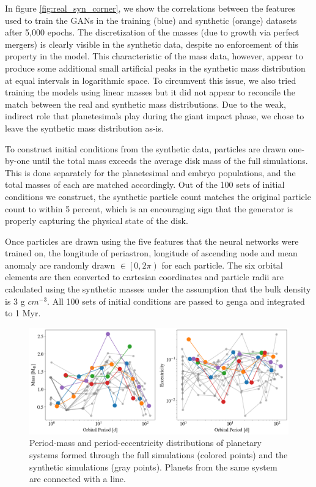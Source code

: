 In figure \ref{fig:real_syn_corner}, we show the correlations between the features used to train the GANs in the training (blue) and synthetic (orange) datasets after 5,000 epochs. The discretization of the masses (due to growth via perfect mergers) is clearly visible in the synthetic data, despite no enforcement of this property in the model. This characteristic of the mass data, however, appear to produce some additional small artificial peaks in the synthetic mass distribution at equal intervals in logarithmic space. To circumvent this issue, we also tried training the models using linear masses but it did not appear to reconcile the match between the real and synthetic mass distributions. Due to the weak, indirect role that planetesimals play during the giant impact phase, we chose to leave the synthetic mass distribution as-is.

To construct initial conditions from the synthetic data, particles are drawn one-by-one until the total mass exceeds the average disk mass of the full simulations. This is done separately for the planetesimal and embryo populations, and the total masses of each are matched accordingly. Out of the 100 sets of initial conditions we construct, the synthetic particle count matches the original particle count to within 5 percent, which is an encouraging sign that the generator is properly capturing the physical state of the disk.

Once particles are drawn using the five features that the neural networks were trained on, the longitude of periastron, longitude of ascending node and mean anomaly are randomly drawn $\in \left[0, 2 \pi \right)$ for each particle. The six orbital elements are then converted to cartesian coordinates and particle radii are calculated using the synthetic masses under the assumption that the bulk density is 3 g $cm^{-3}$. All 100 sets of initial conditions are passed to {\sc genga} and integrated to 1 Myr.

\begin{figure}
\begin{center}
    \includegraphics[width=\textwidth]{figures/stip/per_mass_ecc_syn_comp.png}
    \caption{Period-mass and period-eccentricity distributions of planetary systems formed through the full simulations (colored points) and the synthetic simulations (gray points). Planets from the same system are connected with a line.\label{fig:per_mass_ecc_syn_comp}}
\end{center}
\end{figure}

